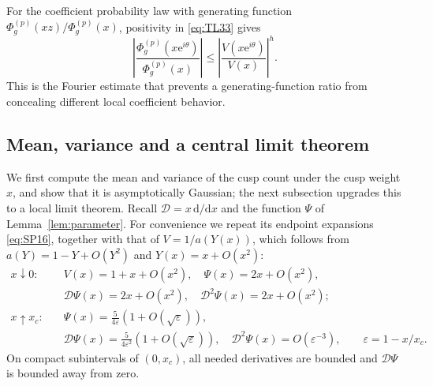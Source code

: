 For the coefficient probability law with generating function
\(\Phi_g^{(p)}(xz)/\Phi_g^{(p)}(x)\), positivity in \eqref{eq:TL33} gives \begin{equation}
\left|\frac{\Phi_g^{(p)}(x\mathrm{e}^{i\theta})}{\Phi_g^{(p)}(x)}\right|
 \le\left|\frac{V(x\mathrm{e}^{i\theta})}{V(x)}\right|^h.
 \label{eq:TL35}
\end{equation} This is the Fourier estimate that prevents a generating-function
ratio from concealing different local coefficient behavior.

\subsection{Mean, variance and a central limit theorem}\label{mean-variance-and-a-real-central-limit-theorem}

We first compute the mean and variance of the cusp count under the cusp
weight \(x\), and show that it is asymptotically Gaussian; the next
subsection upgrades this to a local limit theorem. Recall
\(\mathscr D=x\,\mathrm{d}/\mathrm{d}x\) and the function \(\Psi\) of
Lemma~\ref{lem:parameter}. For convenience we repeat its endpoint expansions
\eqref{eq:SP16}, together with that of \(V=1/a(Y(x))\), which follows from
\(a(Y)=1-Y+O(Y^2)\) and \(Y(x)=x+O(x^2)\): \begin{equation}
\begin{aligned}
 x\downarrow0:\quad& V(x)=1+x+O(x^2),\quad \Psi(x)=2x+O(x^2),\\
 &\mathscr D\Psi(x)=2x+O(x^2),\quad \mathscr D^2\Psi(x)=2x+O(x^2);\\[1mm]
 x\uparrow x_c:\quad&\Psi(x)=\frac5{4\varepsilon}(1+O(\sqrt\varepsilon)),\\
 &\mathscr D\Psi(x)=\frac5{4\varepsilon^2}(1+O(\sqrt\varepsilon)),\quad
 \mathscr D^2\Psi(x)=O(\varepsilon^{-3}),
 \qquad\varepsilon=1-x/x_c.
 \end{aligned}
 \label{eq:TL36}
\end{equation} On compact subintervals of \((0,x_c)\), all needed
derivatives are bounded and \(\mathscr D\Psi\) is bounded away from
zero.

